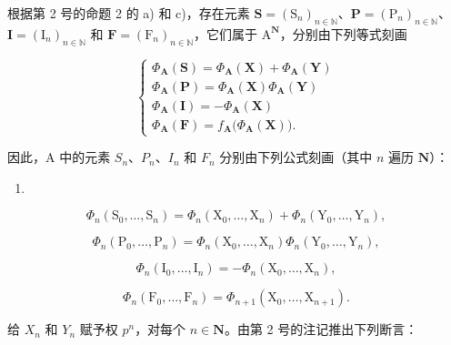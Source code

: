  根据第 2 号的命题 2 的 a) 和 c)，存在元素 \(\mathbf{S} = (\mathrm{S}_{n})_{n\in\mathbb{N}}\)、\(\mathbf{P} = (\mathrm{P}_{n})_{n\in\mathbb{N}}\)、\(\mathbf{I} = (\mathrm{I}_{n})_{n\in\mathbb{N}}\) 和 \(\mathbf{F} = (\mathrm{F}_{n})_{n\in\mathbb{N}}\)，它们属于 \(\mathrm{A}^{\mathbf{N}}\)，分别由下列等式刻画

\[
\left\{ \begin{array}{l} \Phi_ {\mathbf {A}} (\mathbf {S}) = \Phi_ {\mathbf {A}} (\mathbf {X}) + \Phi_ {\mathbf {A}} (\mathbf {Y}) \\ \Phi_ {\mathbf {A}} (\mathbf {P}) = \Phi_ {\mathbf {A}} (\mathbf {X}) \Phi_ {\mathbf {A}} (\mathbf {Y}) \\ \Phi_ {\mathbf {A}} (\mathbf {I}) = - \Phi_ {\mathbf {A}} (\mathbf {X}) \\ \Phi_ {\mathbf {A}} (\mathbf {F}) = f _ {\mathbf {A}} \big (\Phi_ {\mathbf {A}} (\mathbf {X}) \big). \end{array} \right.\tag{11}
\]

因此，A 中的元素 \(S_{n}\)、\(P_{n}\)、\(I_{n}\) 和 \(F_{n}\) 分别由下列公式刻画（其中 \(n\) 遍历 \(\mathbf{N}\)）：

\begin{enumerate}
\def\labelenumi{(\arabic{enumi})}
\setcounter{enumi}{11}
\tightlist
\item
\end{enumerate}

\[
\Phi_ {n} \left(\mathrm{S} _ {0}, \dots , \mathrm{S} _ {n}\right) = \Phi_ {n} \left(\mathrm{X} _ {0}, \dots , \mathrm{X} _ {n}\right) + \Phi_ {n} \left(\mathrm{Y} _ {0}, \dots , \mathrm{Y} _ {n}\right),\tag{13}
\]

\[
\Phi_ {n} \left(\mathrm{P} _ {0}, \dots , \mathrm{P} _ {n}\right) = \Phi_ {n} \left(\mathrm{X} _ {0}, \dots , \mathrm{X} _ {n}\right) \Phi_ {n} \left(\mathrm{Y} _ {0}, \dots , \mathrm{Y} _ {n}\right),\tag{14}
\]

\[
\Phi_ {n} (\mathrm{I} _ {0}, \dots , \mathrm{I} _ {n}) = - \Phi_ {n} (\mathrm{X} _ {0}, \dots , \mathrm{X} _ {n}),\tag{15}
\]

\[
\Phi_ {n} \left(\mathrm{F} _ {0}, \dots , \mathrm{F} _ {n}\right) = \Phi_ {n + 1} \left(\mathrm{X} _ {0}, \dots , \mathrm{X} _ {n + 1}\right).
\]

给 \(X_{n}\) 和 \(Y_{n}\) 赋予权 \(p^{n}\)，对每个 \(n \in \mathbf{N}\)。由第 2 号的注记推出下列断言：

